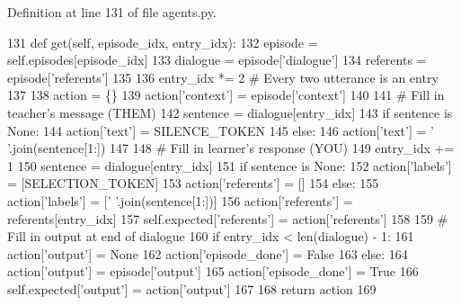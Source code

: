 Definition at line 131 of file agents.\+py.


\begin{DoxyCode}
131     \textcolor{keyword}{def }get(self, episode\_idx, entry\_idx):
132         episode = self.episodes[episode\_idx]
133         dialogue = episode[\textcolor{stringliteral}{'dialogue'}]
134         referents = episode[\textcolor{stringliteral}{'referents'}]
135 
136         entry\_idx *= 2  \textcolor{comment}{# Every two utterance is an entry}
137 
138         action = \{\}
139         action[\textcolor{stringliteral}{'context'}] = episode[\textcolor{stringliteral}{'context'}]
140 
141         \textcolor{comment}{# Fill in teacher's message (THEM)}
142         sentence = dialogue[entry\_idx]
143         \textcolor{keywordflow}{if} sentence \textcolor{keywordflow}{is} \textcolor{keywordtype}{None}:
144             action[\textcolor{stringliteral}{'text'}] = SILENCE\_TOKEN
145         \textcolor{keywordflow}{else}:
146             action[\textcolor{stringliteral}{'text'}] = \textcolor{stringliteral}{' '}.join(sentence[1:])
147 
148         \textcolor{comment}{# Fill in learner's response (YOU)}
149         entry\_idx += 1
150         sentence = dialogue[entry\_idx]
151         \textcolor{keywordflow}{if} sentence \textcolor{keywordflow}{is} \textcolor{keywordtype}{None}:
152             action[\textcolor{stringliteral}{'labels'}] = [SELECTION\_TOKEN]
153             action[\textcolor{stringliteral}{'referents'}] = []
154         \textcolor{keywordflow}{else}:
155             action[\textcolor{stringliteral}{'labels'}] = [\textcolor{stringliteral}{' '}.join(sentence[1:])]
156             action[\textcolor{stringliteral}{'referents'}] = referents[entry\_idx]
157         self.expected[\textcolor{stringliteral}{'referents'}] = action[\textcolor{stringliteral}{'referents'}]
158 
159         \textcolor{comment}{# Fill in output at end of dialogue}
160         \textcolor{keywordflow}{if} entry\_idx < len(dialogue) - 1:
161             action[\textcolor{stringliteral}{'output'}] = \textcolor{keywordtype}{None}
162             action[\textcolor{stringliteral}{'episode\_done'}] = \textcolor{keyword}{False}
163         \textcolor{keywordflow}{else}:
164             action[\textcolor{stringliteral}{'output'}] = episode[\textcolor{stringliteral}{'output'}]
165             action[\textcolor{stringliteral}{'episode\_done'}] = \textcolor{keyword}{True}
166             self.expected[\textcolor{stringliteral}{'output'}] = action[\textcolor{stringliteral}{'output'}]
167 
168         \textcolor{keywordflow}{return} action
169 
\end{DoxyCode}
\mbox{\label{classparlai_1_1tasks_1_1onecommon_1_1agents_1_1OneCommonTeacher_affbbea1344d177d8571245c5f6abfc0c}} 
